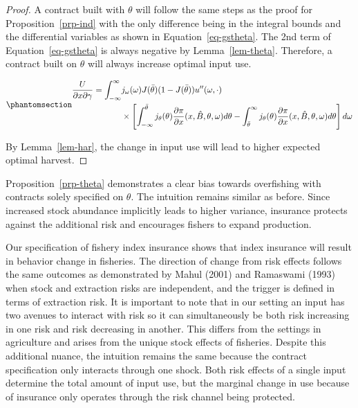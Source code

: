 \documentclass[
  letterpaper,
  DIV=11,
  numbers=noendperiod]{scrartcl}
\theoremstyle{plain}
\theoremstyle{plain}
\theoremstyle{remark}
\begin{document}
\begin{proof}
A contract built with \(\theta\) will follow the same steps as the proof
for Proposition~\ref{prp-ind} with the only difference being in the
integral bounds and the differential variables as shown in
Equation~\ref{eq-gstheta}. The 2nd term of Equation~\ref{eq-gstheta} is
always negative by Lemma~\ref{lem-theta}. Therefore, a contract built on
\(\theta\) will always increase optimal input use.

\begin{equation}\phantomsection\label{eq-gstheta}{
\begin{aligned}
\frac{U}{\partial x \partial \gamma}=\int^{\infty}_{-\infty}&j_{\omega}(\omega)J(\bar\theta)(1-J(\bar\theta))u''(\omega,\cdot)\\
&\times\left[ \int^{\bar\theta}_{-\infty}j_{\theta}(\theta)\frac{\partial \pi}{\partial x}(x,\hat{B},\theta,\omega)d\theta
-\int^{\infty}_{\bar{\theta}}j_{\theta}(\theta)\frac{\partial \pi}{\partial x}(x,\hat{B},\theta,\omega)d\theta\right] d\omega
\end{aligned}
}\end{equation}

By Lemma~\ref{lem-har}, the change in input use will lead to higher
expected optimal harvest.
\end{proof}

Proposition~\ref{prp-theta} demonstrates a clear bias towards
overfishing with contracts solely specified on \(\theta\). The intuition
remains similar as before. Since increased stock abundance implicitly
leads to higher variance, insurance protects against the additional risk
and encourages fishers to expand production.

Our specification of fishery index insurance shows that index insurance
will result in behavior change in fisheries. The direction of change
from risk effects follows the same outcomes as demonstrated by Mahul
(2001) and Ramaswami (1993) when stock and extraction risks are
independent, and the trigger is defined in terms of extraction risk. It
is important to note that in our setting an input has two avenues to
interact with risk so it can simultaneously be both risk increasing in
one risk and risk decreasing in another. This differs from the settings
in agriculture and arises from the unique stock effects of fisheries.
Despite this additional nuance, the intuition remains the same because
the contract specification only interacts through one shock. Both risk
effects of a single input determine the total amount of input use, but
the marginal change in use because of insurance only operates through
the risk channel being protected.
\end{document}
